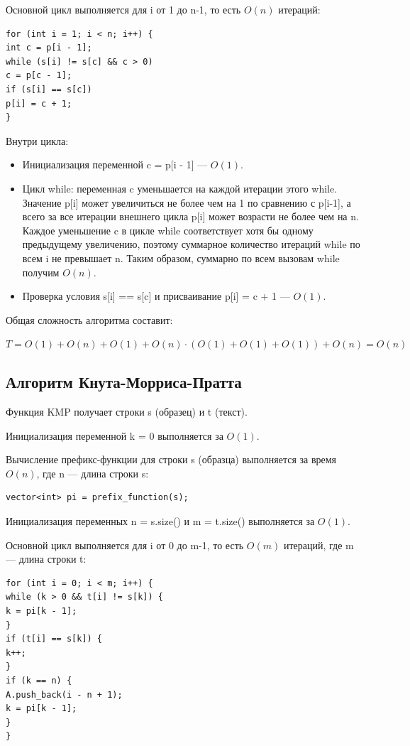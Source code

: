 \documentclass[otchet]{SCWorks}
\begin{document}
Основной цикл выполняется для i от 1 до n-1, то есть $O(n)$ итераций:
\begin{verbatim}
for (int i = 1; i < n; i++) {
int c = p[i - 1];
while (s[i] != s[c] && c > 0)
c = p[c - 1];
if (s[i] == s[c])
p[i] = c + 1;
}
\end{verbatim}

Внутри цикла:
\begin{itemize}
\item Инициализация переменной c = p[i - 1] — $O(1)$.
\item Цикл while: переменная c уменьшается на каждой итерации этого while.
Значение p[i] может увеличиться не более чем на 1 по сравнению с p[i-1], а всего за все итерации внешнего цикла
p[i] может возрасти не более чем на n. Каждое уменьшение c в цикле while соответствует хотя бы одному
предыдущему увеличению, поэтому суммарное количество итераций while по всем i не превышает n.
Таким образом, суммарно по всем вызовам while получим $O(n)$.
\item Проверка условия s[i] == s[c] и присваивание p[i] = c + 1 — $O(1)$.
\end{itemize}

Общая сложность алгоритма составит:

$T = O(1) + O(n) + O(1) + O(n) \cdot (O(1) + O(1) + O(1)) + O(n) = O(n)$

\subsection{Алгоритм Кнута-Морриса-Пратта}

Функция KMP получает строки s (образец) и t (текст).


Инициализация переменной k = 0 выполняется за $O(1)$.

Вычисление префикс-функции для строки s (образца) выполняется за время $O(n)$, где n — длина строки s:
\begin{verbatim}
vector<int> pi = prefix_function(s);
\end{verbatim}

Инициализация переменных n = s.size() и m = t.size() выполняется за $O(1)$.

Основной цикл выполняется для i от 0 до m-1, то есть $O(m)$ итераций, где m — длина строки t:
\begin{verbatim}
for (int i = 0; i < m; i++) {
while (k > 0 && t[i] != s[k]) {
k = pi[k - 1];
}
if (t[i] == s[k]) {
k++;
}
if (k == n) {
A.push_back(i - n + 1);
k = pi[k - 1];
}
}
\end{verbatim}
\end{document}
